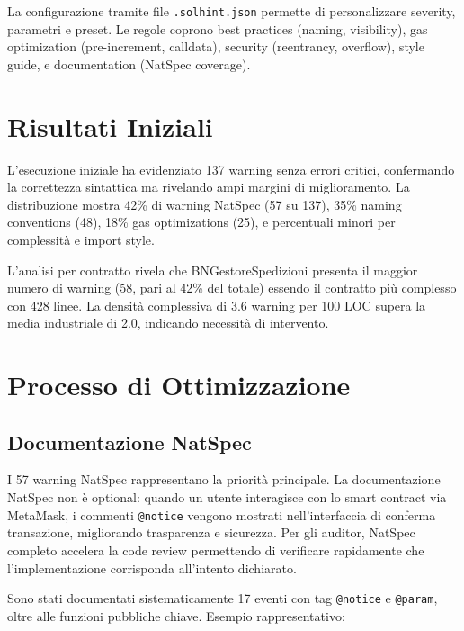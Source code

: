 \documentclass[12pt,a4paper]{article}
\begin{document}
La configurazione tramite file \texttt{.solhint.json} permette di personalizzare severity, parametri e preset. Le regole coprono best practices (naming, visibility), gas optimization (pre-increment, calldata), security (reentrancy, overflow), style guide, e documentation (NatSpec coverage).

\section{Risultati Iniziali}

L'esecuzione iniziale ha evidenziato 137 warning senza errori critici, confermando la correttezza sintattica ma rivelando ampi margini di miglioramento. La distribuzione mostra 42\% di warning NatSpec (57 su 137), 35\% naming conventions (48), 18\% gas optimizations (25), e percentuali minori per complessità e import style.

L'analisi per contratto rivela che BNGestoreSpedizioni presenta il maggior numero di warning (58, pari al 42\% del totale) essendo il contratto più complesso con 428 linee. La densità complessiva di 3.6 warning per 100 LOC supera la media industriale di 2.0, indicando necessità di intervento.

\section{Processo di Ottimizzazione}

\subsection{Documentazione NatSpec}

I 57 warning NatSpec rappresentano la priorità principale. La documentazione NatSpec non è optional: quando un utente interagisce con lo smart contract via MetaMask, i commenti \texttt{@notice} vengono mostrati nell'interfaccia di conferma transazione, migliorando trasparenza e sicurezza. Per gli auditor, NatSpec completo accelera la code review permettendo di verificare rapidamente che l'implementazione corrisponda all'intento dichiarato.

Sono stati documentati sistematicamente 17 eventi con tag \texttt{@notice} e \texttt{@param}, oltre alle funzioni pubbliche chiave. Esempio rappresentativo:
\end{document}
